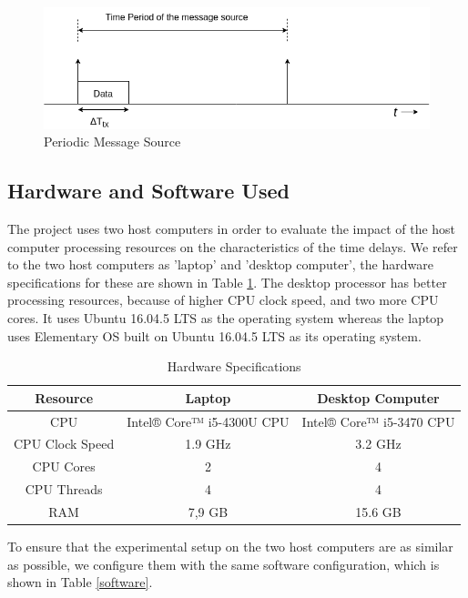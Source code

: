 \begin{figure}[h!]
\centering
\includegraphics[width=\textwidth]{Figure/Message_Source.png}
\caption{Periodic Message Source}
\label{message_source}
\end{figure}

\subsection{Hardware and Software Used}
The project uses two host computers in order to evaluate the impact of the host computer processing resources on the characteristics of the time delays.
We refer to the two host computers as 'laptop' and 'desktop computer', the hardware specifications for these are shown in Table \ref{hardware}.
The desktop processor has better processing resources, because of higher CPU clock speed, and two more CPU cores.
It uses Ubuntu 16.04.5 LTS as the operating system whereas the laptop uses Elementary OS built on Ubuntu 16.04.5 LTS as its operating system.\\
\begin{table}[h!]
    \centering
    \begin{tabular}{|c|c|c|}
    \hline
        Resource & Laptop & Desktop Computer\\
        \hline
         CPU & Intel® Core™ i5-4300U CPU &  Intel® Core™ i5-3470 CPU \\
         CPU Clock Speed & 1.9 GHz & 3.2 GHz \\
         CPU Cores & 2 & 4\\
         CPU Threads & 4 & 4\\
         RAM & 7,9 GB & 15.6 GB \\
         \hline
    \end{tabular}
    \caption{Hardware Specifications}
    \label{hardware}
\end{table}

To ensure that the experimental setup on the two host computers are as similar as possible, we configure them with the same software configuration, which is shown in Table \ref{software}.

